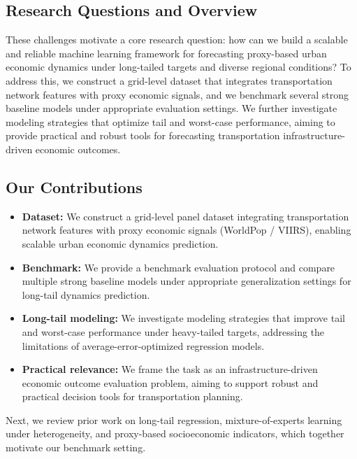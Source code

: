 \documentclass[11pt,conference,onecolumn]{IEEEtran}
\begin{document}
\subsection{Research Questions and Overview}

These challenges motivate a core research question: how can we build a scalable and reliable machine learning framework for forecasting proxy-based urban economic dynamics under long-tailed targets and diverse regional conditions? To address this, we construct a grid-level dataset that integrates transportation network features with proxy economic signals, and we benchmark several strong baseline models under appropriate evaluation settings. We further investigate modeling strategies that optimize tail and worst-case performance, aiming to provide practical and robust tools for forecasting transportation infrastructure-driven economic outcomes.

\subsection{Our Contributions}
\begin{itemize}
    \item \textbf{Dataset:} We construct a grid-level panel dataset integrating transportation network features with proxy economic signals (WorldPop / VIIRS), enabling scalable urban economic dynamics prediction.
    
    \item \textbf{Benchmark:} We provide a benchmark evaluation protocol and compare multiple strong baseline models under appropriate generalization settings for long-tail dynamics prediction.

    \item \textbf{Long-tail modeling:} We investigate modeling strategies that improve tail and worst-case performance under heavy-tailed targets, addressing the limitations of average-error-optimized regression models.

    \item \textbf{Practical relevance:} We frame the task as an infrastructure-driven economic outcome evaluation problem, aiming to support robust and practical decision tools for transportation planning.
    
\end{itemize}

Next, we review prior work on long-tail regression, mixture-of-experts learning under heterogeneity, and proxy-based socioeconomic indicators, which together motivate our benchmark setting.
\end{document}
